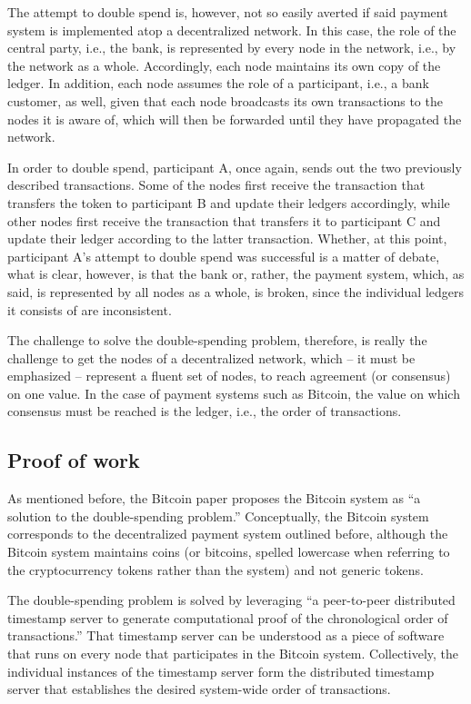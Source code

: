 The attempt to double spend is, however, not so easily averted if said payment system is implemented atop a decentralized network.
In this case, the role of the central party, i.e., the bank, is represented by every node in the network, i.e., by the network as a whole.
Accordingly, each node maintains its own copy of the ledger.
In addition, each node assumes the role of a participant, i.e., a bank customer, as well, given that each node broadcasts its own transactions to the nodes it is aware of, which will then be forwarded until they have propagated the network.

In order to double spend, participant A, once again, sends out the two previously described transactions.
Some of the nodes first receive the transaction that transfers the token to participant B and update their ledgers accordingly, while other nodes first receive the transaction that transfers it to participant C and update their ledger according to the latter transaction.
Whether, at this point, participant A's attempt to double spend was successful is a matter of debate, what is clear, however, is that the bank or, rather, the payment system, which, as said, is represented by all nodes as a whole, is broken, since the individual ledgers it consists of are inconsistent.

The challenge to solve the double-spending problem, therefore, is really the challenge to get the nodes of a decentralized network, which -- it must be emphasized -- represent a fluent set of nodes, to reach agreement (or consensus) on one value.
In the case of payment systems such as Bitcoin, the value on which consensus must be reached is the ledger, i.e., the order of transactions.

\subsection{Proof of work}

As mentioned before, the Bitcoin paper proposes the Bitcoin system as ``a solution to the double-spending problem.'' \autocite[1]{nakamoto2008}
Conceptually, the Bitcoin system corresponds to the decentralized payment system outlined before, although the Bitcoin system maintains coins (or bitcoins, spelled lowercase when referring to the cryptocurrency tokens rather than the system) and not generic tokens.

The double-spending problem is solved by leveraging ``a peer-to-peer distributed timestamp server to generate computational proof of the chronological order of transactions.''
That timestamp server can be understood as a piece of software that runs on every node that participates in the Bitcoin system.
Collectively, the individual instances of the timestamp server form the distributed timestamp server that establishes the desired system-wide order of transactions.

